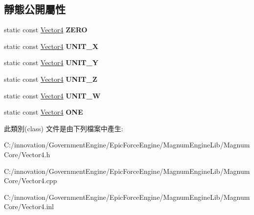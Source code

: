 \subsection*{靜態公開屬性}
\begin{DoxyCompactItemize}
\item 
static const \hyperlink{class_i_dream_sky_1_1_vector4}{Vector4} {\bfseries Z\+E\+RO}\hypertarget{class_i_dream_sky_1_1_vector4_aa0273d215d6e268f492bb816c21adf1d}{}\label{class_i_dream_sky_1_1_vector4_aa0273d215d6e268f492bb816c21adf1d}

\item 
static const \hyperlink{class_i_dream_sky_1_1_vector4}{Vector4} {\bfseries U\+N\+I\+T\+\_\+X}\hypertarget{class_i_dream_sky_1_1_vector4_ae8f3cc1401814b45e6d00be0353b949a}{}\label{class_i_dream_sky_1_1_vector4_ae8f3cc1401814b45e6d00be0353b949a}

\item 
static const \hyperlink{class_i_dream_sky_1_1_vector4}{Vector4} {\bfseries U\+N\+I\+T\+\_\+Y}\hypertarget{class_i_dream_sky_1_1_vector4_ad68e323bb0ebf5a7fc71f2dfbe26ff95}{}\label{class_i_dream_sky_1_1_vector4_ad68e323bb0ebf5a7fc71f2dfbe26ff95}

\item 
static const \hyperlink{class_i_dream_sky_1_1_vector4}{Vector4} {\bfseries U\+N\+I\+T\+\_\+Z}\hypertarget{class_i_dream_sky_1_1_vector4_a001ab8ceba1da588f1f562073a7ff831}{}\label{class_i_dream_sky_1_1_vector4_a001ab8ceba1da588f1f562073a7ff831}

\item 
static const \hyperlink{class_i_dream_sky_1_1_vector4}{Vector4} {\bfseries U\+N\+I\+T\+\_\+W}\hypertarget{class_i_dream_sky_1_1_vector4_ae921e7bde6a92c77d110568834bf7c68}{}\label{class_i_dream_sky_1_1_vector4_ae921e7bde6a92c77d110568834bf7c68}

\item 
static const \hyperlink{class_i_dream_sky_1_1_vector4}{Vector4} {\bfseries O\+NE}\hypertarget{class_i_dream_sky_1_1_vector4_ade19405c6b0234ed1dd1937fdc59a3cf}{}\label{class_i_dream_sky_1_1_vector4_ade19405c6b0234ed1dd1937fdc59a3cf}

\end{DoxyCompactItemize}


此類別(class) 文件是由下列檔案中產生\+:\begin{DoxyCompactItemize}
\item 
C\+:/innovation/\+Government\+Engine/\+Epic\+Force\+Engine/\+Magnum\+Engine\+Lib/\+Magnum\+Core/Vector4.\+h\item 
C\+:/innovation/\+Government\+Engine/\+Epic\+Force\+Engine/\+Magnum\+Engine\+Lib/\+Magnum\+Core/Vector4.\+cpp\item 
C\+:/innovation/\+Government\+Engine/\+Epic\+Force\+Engine/\+Magnum\+Engine\+Lib/\+Magnum\+Core/Vector4.\+inl\end{DoxyCompactItemize}
